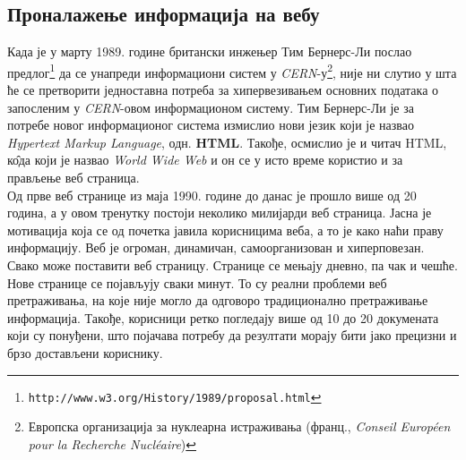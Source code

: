 \subsection{Проналажење информација на вебу}
Када је у марту 1989. године британски инжењер Тим Бернерс-Ли послао предлог\footnote{\texttt{http://www.w3.org/History/1989/proposal.html}}  да се унапреди информациони систем у \emph{CERN}-у\footnote{Европска организација за нуклеарна истраживања (франц., \emph{Conseil Européen pour la Recherche Nucléaire})}, није ни слутио у шта ће се претворити једноставна потреба за хипервезивањем основних података о запосленим у \emph{CERN}-овом информационом систему\cite{berners2004weaving}. Тим Бернерс-Ли је за потребе новог информационог система измислио нови језик који је назвао \emph{Hypertext Markup Language}, одн. \textbf{HTML}. Такође, осмислио је и читач HTML, к\^{о}да који је назвао \emph{World Wide Web} и он се у исто време користио и за прављење веб страница. \\
Од прве веб странице из маја 1990. године до данас је прошло више од 20 година, а у овом тренутку постоји неколико милијарди веб страница. Јасна је мотивација која се од почетка јавила корисницима веба, а то је како наћи праву информацију. Веб је огроман, динамичан, самоорганизован и хиперповезан.\cite[Ch 1.3.1]{langville2011google} Свако може поставити веб страницу. Странице се мењају дневно, па чак и чешће. Нове странице се појављују сваки минут. То су реални проблеми веб претраживања, на које није могло да одговоро традиционално претраживање информација. Такође, корисници ретко погледају више од 10 до 20 докумената који су понуђени, што појачава потребу да резултати морају бити јако прецизни и брзо достављени кориснику.\\
